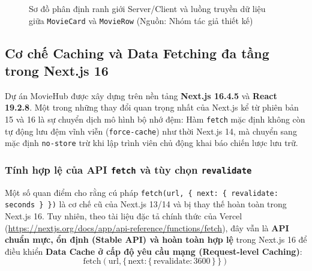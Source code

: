 \documentclass[12pt,a4paper]{extarticle}
\begin{document}
\begin{figure}[H]
{
}
\caption{Sơ đồ phân định ranh giới Server/Client và luồng truyền dữ liệu giữa \texttt{MovieCard} và \texttt{MovieRow} (Nguồn: Nhóm tác giả thiết kế)}
\label{fig:server_client_boundary}
\end{figure}

\subsection{Cơ chế Caching và Data Fetching đa tầng trong Next.js 16}

Dự án MovieHub được xây dựng trên nền tảng \textbf{Next.js 16.4.5} và \textbf{React 19.2.8}. Một trong những thay đổi quan trọng nhất của Next.js kể từ phiên bản 15 và 16 là sự chuyển dịch mô hình bộ nhớ đệm: Hàm \texttt{fetch} mặc định không còn tự động lưu đệm vĩnh viễn (\texttt{force-cache}) như thời Next.js 14, mà chuyển sang mặc định \texttt{no-store} trừ khi lập trình viên chủ động khai báo chiến lược lưu trữ.

\subsubsection{Tính hợp lệ của API \texttt{fetch} và tùy chọn \texttt{revalidate}}
Một số quan điểm cho rằng cú pháp \texttt{fetch(url, \{ next: \{ revalidate: seconds \} \})} là cơ chế cũ của Next.js 13/14 và bị thay thế hoàn toàn trong Next.js 16. Tuy nhiên, theo tài liệu đặc tả chính thức của Vercel (\url{https://nextjs.org/docs/app/api-reference/functions/fetch}), đây vẫn là \textbf{API chuẩn mực, ổn định (Stable API) và hoàn toàn hợp lệ} trong Next.js 16 để điều khiển \textbf{Data Cache ở cấp độ yêu cầu mạng (Request-level Caching)}:
\begin{equation}
\text{fetch}(\text{url}, \{\, \text{next}: \{\, \text{revalidate}: 3600 \,\} \,\})
\end{equation}
\end{document}
